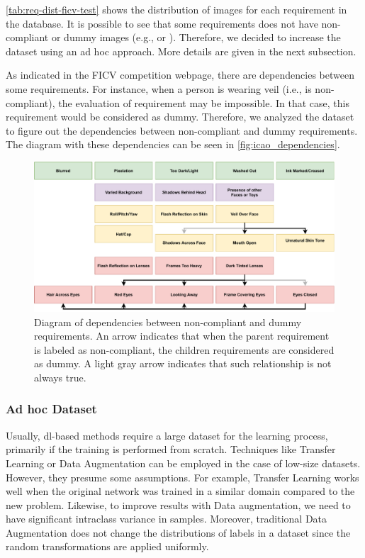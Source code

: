 \autoref{tab:req-dist-ficv-test} shows the distribution of images for each requirement in the \ficvtest database. It is possible to see that some requirements does not have non-compliant or dummy images (e.g., \citeReq{\inkmarked} or \citeReq{\framestooheavy}). Therefore, we decided to increase the \ficvtest dataset using an ad hoc approach. More details are given in the next subsection.



As indicated in the FICV competition webpage, there are dependencies between some requirements. For instance, when a person is wearing veil (i.e., \citeReq{\veiloverface} is non-compliant), the evaluation of requirement \citeReq{\mouthopen} may be impossible. In that case, this requirement would be considered as dummy. Therefore, we analyzed the \ficvtest dataset to figure out the dependencies between non-compliant and dummy requirements. The diagram with these dependencies can be seen in \autoref{fig:icao_dependencies}.

\begin{figure}
\centering
\includegraphics[width=\linewidth]{images/icao_dependencies.pdf}
\caption{Diagram of dependencies between non-compliant and dummy requirements. An arrow indicates that when the parent requirement is labeled as non-compliant, the children requirements are considered as dummy. A light gray arrow indicates that such relationship is not always true.}
\label{fig:icao_dependencies}
\end{figure}

\subsubsection{Ad hoc Dataset}

 Usually, \acl{dl}-based methods require a large dataset for the learning process, primarily if the training is performed from scratch. Techniques like Transfer Learning or Data Augmentation can be employed in the case of low-size datasets. However, they presume some assumptions. For example, Transfer Learning works well when the original network was trained in a similar domain compared to the new problem. Likewise, to improve results with Data augmentation, we need to have significant intraclass variance in samples. Moreover, traditional Data Augmentation does not change the distributions of labels in a dataset since the random transformations are applied uniformly. 
 
